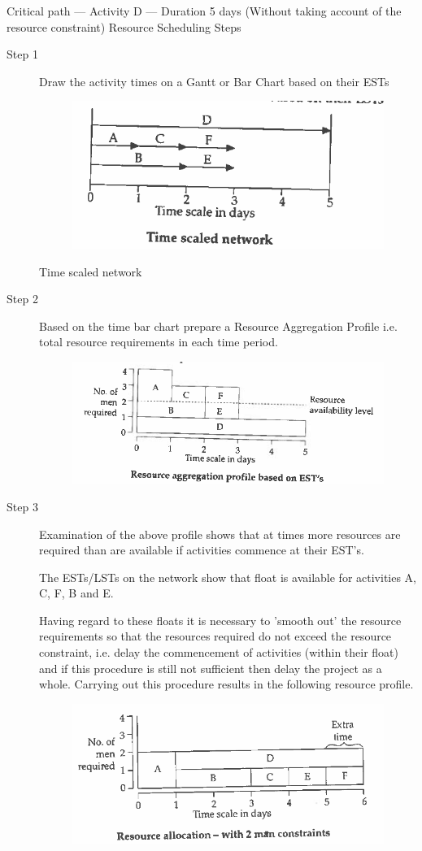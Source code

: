 \documentclass[]{report}
\begin{document}
	Critical path — Activity D — Duration 5 days (Without taking account of the resource constraint) Resource Scheduling Steps 
\begin{description}
\item[Step 1] Draw the activity times on a Gantt or Bar Chart based on their ESTs 
	
\begin{figure}[h!]
\centering
\includegraphics[width=0.4\linewidth]{images4/349-b}
\caption{}
\label{fig:349-b}
\end{figure}

	
	Time scaled network 
\item[Step 2] Based on the time bar chart prepare a Resource Aggregation Profile i.e. total resource requirements in each time period. 
\begin{figure}[h!]
\centering
\includegraphics[width=0.4\linewidth]{images4/349-c}
\caption{}
\label{fig:349-c}
\end{figure}
\item[Step 3]Examination of the above profile shows that at times more resources are required than are available if activities commence at their EST's. 

	
The ESTs/LSTs on the network show that float is available for activities A, C, F, B and E. 
	
	Having regard to these floats it is necessary to 'smooth out' the resource requirements so that the resources required do not exceed the resource constraint, i.e. delay 
	the commencement of activities (within their float) and if this procedure is still not sufficient then delay the project as a whole. Carrying out this procedure results 
	in the following resource profile. 
	
\begin{figure}[h!]
\centering
\includegraphics[width=0.4\linewidth]{images4/350-a}
\caption{}
\label{fig:350-a}
\end{figure}


\end{description}
\end{document}
